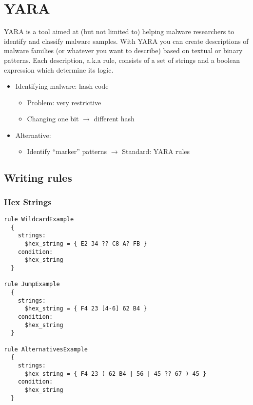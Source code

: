 \section{YARA}
YARA is a tool aimed at (but not limited to) helping malware researchers to identify and classify malware samples. 
With YARA you can create descriptions of malware families (or whatever you want to describe) based on textual or binary patterns. 
Each description, a.k.a rule, consists of a set of strings and a boolean expression which determine its logic.
\begin{itemize}
  \item Identifying malware: hash code
  \begin{itemize}
    \item Problem: very restrictive
    \item Changing one bit $\rightarrow$ different hash
  \end{itemize}
  \item Alternative:
  \begin{itemize}
    \item Identify ``marker'' patterns $\rightarrow$ Standard: YARA rules
  \end{itemize}
\end{itemize}

\subsection{Writing rules}
\subsubsection{Hex Strings}
\begin{lstlisting}
rule WildcardExample
  {
    strings:
      $hex_string = { E2 34 ?? C8 A? FB }
    condition:
      $hex_string
  }

rule JumpExample
  {
    strings:
      $hex_string = { F4 23 [4-6] 62 B4 }
    condition:
      $hex_string
  }

rule AlternativesExample
  {
    strings:
      $hex_string = { F4 23 ( 62 B4 | 56 | 45 ?? 67 ) 45 }
    condition:
      $hex_string
  }
\end{lstlisting}

